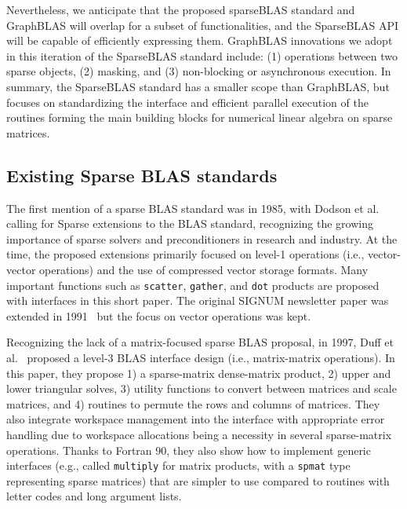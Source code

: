 \documentclass[manuscript,review]{acmart}
\begin{document}
Nevertheless, we anticipate that the proposed sparseBLAS standard and GraphBLAS will overlap for a subset of functionalities, and the SparseBLAS API will be capable of efficiently expressing them. GraphBLAS innovations we adopt in this iteration of the SparseBLAS standard include: (1) operations between two sparse objects, (2) masking, and (3) non-blocking or asynchronous execution. 
In summary, the SparseBLAS standard has a smaller scope than GraphBLAS, but focuses on standardizing
the interface and efficient parallel execution of the routines forming the main building blocks
for numerical linear algebra on sparse matrices.

\subsection{Existing Sparse BLAS standards}
\label{sec:existingsparseblas}
The first mention of a sparse BLAS standard was in 1985, with Dodson et
al.~\cite{10.1145/1057935.1057938} calling for Sparse extensions to the BLAS standard, recognizing the growing importance of sparse
solvers and preconditioners in research and industry. At the time, the proposed
extensions primarily focused on level-1 operations (i.e., vector-vector
operations) and the use of compressed vector storage formats. Many important
functions such as \texttt{scatter}, \texttt{gather}, and \texttt{dot}
products are proposed with interfaces in
this short paper. The original SIGNUM newsletter paper was extended in
1991~\cite{10.1145/108556.108577} but the focus on vector operations was kept.

Recognizing the lack of a matrix-focused sparse BLAS proposal, in 1997, Duff et
al.~\cite{10.1145/275323.275327} proposed a level-3 BLAS interface design (i.e.,
matrix-matrix operations). In this paper, they propose 1) a sparse-matrix
dense-matrix product, 2) upper and lower triangular solves, 3) utility functions
to convert between matrices and scale matrices, and 4) routines to permute the
rows and columns of matrices. They also integrate workspace management into the
interface with appropriate error handling due to workspace allocations being a
necessity in several sparse-matrix operations. Thanks to Fortran 90, they also
show how to implement generic interfaces (e.g., called \texttt{multiply} for matrix
products, with a \texttt{spmat} type representing sparse matrices) that are simpler
to use compared to routines with letter codes and long argument lists.
\end{document}
